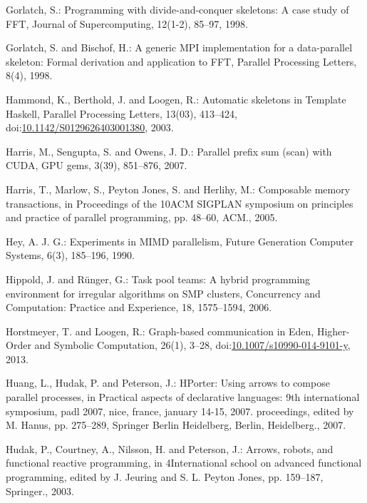 \documentclass[paper=A4,twoside=true,openright,parskip=full,chapterprefix=true,headings=normal,bibliography=totoc,listof=totoc,titlepage=on,captions=tableabove,draft=false,british]{scrreprt}%
\begin{document}
\leavevmode\hypertarget{ref-Gorlatch1998}{}%
Gorlatch, S.: Programming with divide-and-conquer skeletons: A case
study of FFT, Journal of Supercomputing, 12(1-2), 85--97, 1998.

\leavevmode\hypertarget{ref-Gorlatch}{}%
Gorlatch, S. and Bischof, H.: A generic MPI implementation for a
data-parallel skeleton: Formal derivation and application to FFT,
Parallel Processing Letters, 8(4), 1998.

\leavevmode\hypertarget{ref-doi:10.1142ux2fS0129626403001380}{}%
Hammond, K., Berthold, J. and Loogen, R.: Automatic skeletons in
Template Haskell, Parallel Processing Letters, 13(03), 413--424,
doi:\href{https://doi.org/10.1142/S0129626403001380}{10.1142/S0129626403001380},
2003.

\leavevmode\hypertarget{ref-harris2007parallel}{}%
Harris, M., Sengupta, S. and Owens, J. D.: Parallel prefix sum (scan)
with CUDA, GPU gems, 3(39), 851--876, 2007.

\leavevmode\hypertarget{ref-Harris:2005:CMT:1065944.1065952}{}%
Harris, T., Marlow, S., Peyton Jones, S. and Herlihy, M.: Composable
memory transactions, in Proceedings of the 10ACM SIGPLAN symposium on
principles and practice of parallel programming, pp. 48--60, ACM., 2005.

\leavevmode\hypertarget{ref-Hey1990185}{}%
Hey, A. J. G.: Experiments in MIMD parallelism, Future Generation
Computer Systems, 6(3), 185--196, 1990.

\leavevmode\hypertarget{ref-Hippold2006}{}%
Hippold, J. and Rünger, G.: Task pool teams: A hybrid programming
environment for irregular algorithms on SMP clusters, Concurrency and
Computation: Practice and Experience, 18, 1575--1594, 2006.

\leavevmode\hypertarget{ref-Horstmeyer2013}{}%
Horstmeyer, T. and Loogen, R.: Graph-based communication in Eden,
Higher-Order and Symbolic Computation, 26(1), 3--28,
doi:\href{https://doi.org/10.1007/s10990-014-9101-y}{10.1007/s10990-014-9101-y},
2013.

\leavevmode\hypertarget{ref-Huang2007}{}%
Huang, L., Hudak, P. and Peterson, J.: HPorter: Using arrows to compose
parallel processes, in Practical aspects of declarative languages: 9th
international symposium, padl 2007, nice, france, january 14-15, 2007.
proceedings, edited by M. Hanus, pp. 275--289, Springer Berlin
Heidelberg, Berlin, Heidelberg., 2007.

\leavevmode\hypertarget{ref-Hudak2003}{}%
Hudak, P., Courtney, A., Nilsson, H. and Peterson, J.: Arrows, robots,
and functional reactive programming, in 4International school on
advanced functional programming, edited by J. Jeuring and S. L. Peyton
Jones, pp. 159--187, Springer., 2003.
\end{document}
